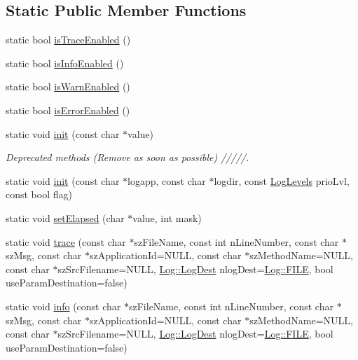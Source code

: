 \subsection*{Static Public Member Functions}
\begin{DoxyCompactItemize}
\item 
static bool \hyperlink{classutils_1_1Log_ad5b43b0f5ea6a8b447407a33cda5a4bf}{is\+Trace\+Enabled} ()
\item 
static bool \hyperlink{classutils_1_1Log_af831fb2def9d0984c712ca6c73cf2cd8}{is\+Info\+Enabled} ()
\item 
static bool \hyperlink{classutils_1_1Log_a99a23d525a51c3290f793dedadc65470}{is\+Warn\+Enabled} ()
\item 
static bool \hyperlink{classutils_1_1Log_ac8b80b98cd9f5de11e53980a873862a4}{is\+Error\+Enabled} ()
\item 
static void \hyperlink{classutils_1_1Log_a78fee29378f2064f9ee8299cb59d26ce}{init} (const char $\ast$value)
\begin{DoxyCompactList}\small\item\em Deprecated methods (Remove as soon as possible) /////. \end{DoxyCompactList}\item 
static void \hyperlink{classutils_1_1Log_a0a94150091c4d2768da2eac92006bdc7}{init} (const char $\ast$logapp, const char $\ast$logdir, const \hyperlink{classutils_1_1Log_a8f981afda2b7802a6e9ca4aac269d54a}{Log\+Levels} prio\+Lvl, const bool flag)
\item 
static void \hyperlink{classutils_1_1Log_aecbaeed2809b1cf54b5d78fbc9870ebe}{set\+Elapsed} (char $\ast$value, int mask)
\item 
static void \hyperlink{classutils_1_1Log_a37ae89eca0ad705c5e948710406e2054}{trace} (const char $\ast$sz\+File\+Name, const int n\+Line\+Number, const char $\ast$sz\+Msg, const char $\ast$sz\+Application\+Id=N\+U\+LL, const char $\ast$sz\+Method\+Name=N\+U\+LL, const char $\ast$sz\+Src\+Filename=N\+U\+LL, \hyperlink{classutils_1_1Log_aa77064096777fe92d4ff8f6d68d42d5a}{Log\+::\+Log\+Dest} nlog\+Dest=\hyperlink{classutils_1_1Log_aa77064096777fe92d4ff8f6d68d42d5aaa4c1e78fb35ae098bba52e43e2a5e0e5}{Log\+::\+F\+I\+LE}, bool use\+Param\+Destination=false)
\item 
static void \hyperlink{classutils_1_1Log_acee86547a863c04b349ab46a3b7ba9f2}{info} (const char $\ast$sz\+File\+Name, const int n\+Line\+Number, const char $\ast$sz\+Msg, const char $\ast$sz\+Application\+Id=N\+U\+LL, const char $\ast$sz\+Method\+Name=N\+U\+LL, const char $\ast$sz\+Src\+Filename=N\+U\+LL, \hyperlink{classutils_1_1Log_aa77064096777fe92d4ff8f6d68d42d5a}{Log\+::\+Log\+Dest} nlog\+Dest=\hyperlink{classutils_1_1Log_aa77064096777fe92d4ff8f6d68d42d5aaa4c1e78fb35ae098bba52e43e2a5e0e5}{Log\+::\+F\+I\+LE}, bool use\+Param\+Destination=false)

\end{DoxyCompactItemize}
